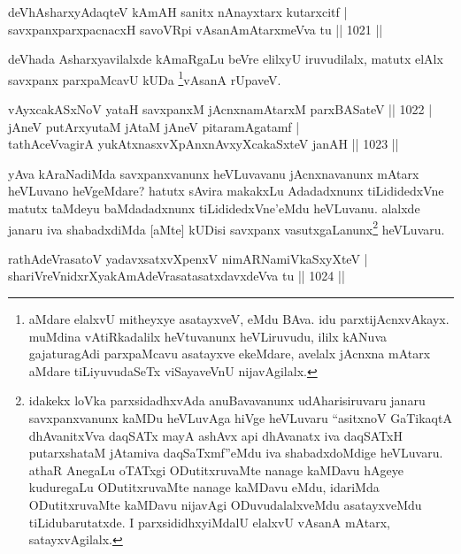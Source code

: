 
\begin{shl}
deVhAsharxyAdaqteV kAmAH sanitx nAnayxtarx kutarxcitf | \\
savxpanxparxpacnacxH savoVR\s pi vAsanAmAtarxmeVva tu \hfill||  1021 ||  
\end{shl}

\begin{artha}
deVhada Asharxyavilalxde kAmaRgaLu beVre elilxyU iruvudilalx, matutx elAlx savxpanx parxpaMcavU kUDa \footnote{aMdare elalxvU mitheyxye asatayxveV, eMdu BAva. idu parxtijAcnxvAkayx. muMdina vAtiRkadalilx heVtuvanunx heVLiruvudu, ililx kANuva gajaturagAdi parxpaMcavu asatayxve ekeMdare, avelalx jAcnxna mAtarx aMdare tiLiyuvudaSeTx viSayaveVnU nijavAgilalx.}vAsanA rUpaveV.
\end{artha}


\begin{shl}
vAyxcakASxNoV yataH savxpanxM jAcnxnamAtarxM parxBASateV \hfill||  1022 | \\
jAneV putArxyutaM jAtaM jAneV pitaramAgatamf | \\
tathAceVvagirA yukAtxnasxvXpAnxnAvxyXcakaSxteV janAH \hfill||  1023 ||  
\end{shl}

\begin{artha}
yAva kAraNadiMda savxpanxvanunx heVLuvavanu jAcnxnavanunx mAtarx heVLuvano heVgeMdare? hatutx sAvira makakxLu Adadadxnunx tiLididedxVne matutx taMdeyu baMdadadxnunx tiLididedxVne'eMdu heVLuvanu. alalxde janaru iva shabadxdiMda [aMte] kUDisi savxpanx vasutxgaLanunx\footnote{idakekx loVka parxsidadhxvAda anuBavavanunx udAharisiruvaru janaru savxpanxvanunx kaMDu heVLuvAga hiVge heVLuvaru ``asitxnoV GaTikaqtA dhAvanitxVva daqSATx mayA ashAvx api dhAvanatx iva daqSATxH putarxshataM jAtamiva daqSaTxmf''eMdu iva shabadxdoMdige heVLuvaru. athaR AnegaLu oTATxgi ODutitxruvaMte nanage kaMDavu hAgeye kuduregaLu ODutitxruvaMte nanage kaMDavu eMdu, idariMda ODutitxruvaMte kaMDavu nijavAgi ODuvudalalxveMdu asatayxveMdu tiLidubarutatxde. I parxsididhxyiMdalU elalxvU vAsanA mAtarx, satayxvAgilalx.} heVLuvaru.
\end{artha}

\begin{shl}
\footnotemark[3]rathAdeVrasatoV yadavxsatxvXpenxV nimARNamiVkaSxyXteV | \\
shariVreVnidxrXyakAmAdeVrasatasatxdavxdeVva tu \hfill||  1024 ||  
\end{shl}


